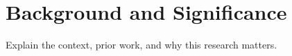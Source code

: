\section{Background and Significance}

Explain the context, prior work, and why this research matters.

